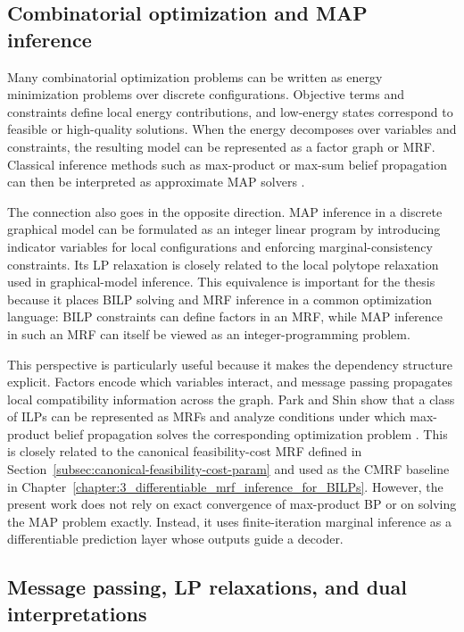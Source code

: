 \subsection{Combinatorial optimization and MAP inference}
\label{subsec:rw_co_as_map}

Many combinatorial optimization problems can be written as energy minimization problems over discrete configurations. Objective terms and constraints define local energy contributions, and low-energy states correspond to feasible or high-quality solutions. When the energy decomposes over variables and constraints, the resulting model can be represented as a factor graph or MRF. Classical inference methods such as max-product or max-sum belief propagation can then be interpreted as approximate MAP solvers \cite{kschischang_factor_2001,wainwright_graphical_2007}.

The connection also goes in the opposite direction. MAP inference in a discrete graphical model can be formulated as an integer linear program by introducing indicator variables for local configurations and enforcing marginal-consistency constraints. Its LP relaxation is closely related to the local polytope relaxation used in graphical-model inference. This equivalence is important for the thesis because it places BILP solving and MRF inference in a common optimization language: BILP constraints can define factors in an MRF, while MAP inference in such an MRF can itself be viewed as an integer-programming problem.

This perspective is particularly useful because it makes the dependency structure explicit. Factors encode which variables interact, and message passing propagates local compatibility information across the graph. Park and Shin show that a class of ILPs can be represented as MRFs and analyze conditions under which max-product belief propagation solves the corresponding optimization problem \cite{park_max-product_2017}. This is closely related to the canonical feasibility-cost MRF defined in Section~\ref{subsec:canonical-feasibility-cost-param} and used as the CMRF baseline in Chapter~\ref{chapter:3_differentiable_mrf_inference_for_BILPs}. However, the present work does not rely on exact convergence of max-product BP or on solving the MAP problem exactly. Instead, it uses finite-iteration marginal inference as a differentiable prediction layer whose outputs guide a decoder.

\subsection{Message passing, LP relaxations, and dual interpretations}
\label{subsec:rw_message_passing_duality}

